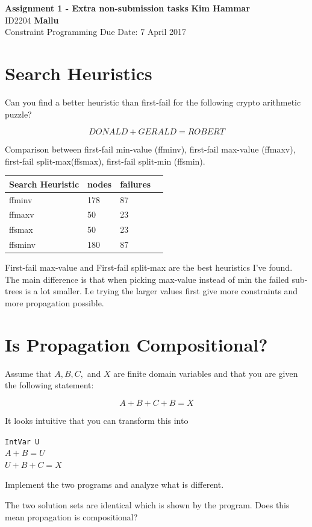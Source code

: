 \documentclass[a4paper, 11pt]{article}
\begin{document}
\noindent
\large\textbf{Assignment 1  - Extra non-submission tasks} \hfill \textbf{Kim Hammar} \\
\normalsize ID2204 \hfill  \textbf{Mallu} \\
Constraint Programming \hfill Due Date: 7 April 2017\\
\section*{Search Heuristics}
Can you find a better heuristic than first-fail for the following crypto arithmetic puzzle?

$$DONALD + GERALD = ROBERT$$

Comparison between first-fail min-value (ffminv), first-fail max-value (ffmaxv), first-fail split-max(ffsmax), first-fail split-min (ffsmin).
\begin{center}
  \begin{tabular}{ | l | l | l | p{7cm} |}
    \hline
    \textbf{Search Heuristic} & \textbf{nodes} & \textbf{failures} \\ \hline
    ffminv & 178 & 87 \\\hline
    ffmaxv & 50 & 23 \\\hline
    ffsmax & 50 & 23 \\\hline
    ffsminv & 180 & 87 \\\hline
  \end{tabular}
\end{center}
First-fail max-value and First-fail split-max are the best heuristics I've found. The main difference is that when picking max-value instead of min the failed sub-trees is a lot smaller. I.e trying the larger values first give more constraints and more propagation possible.

\section*{Is Propagation Compositional?}
Assume that $A, B, C,$ and $X$ are finite domain variables and that you are given
the following statement:

$$A+B+C+B = X$$

It looks intuitive that you can transform this into

\texttt{IntVar U}\\
$A+B = U$\\
$U+B+C = X$

Implement the two programs and analyze what is different.

The two solution sets are identical which is shown by the program. Does this mean propagation is compositional?
\end{document}
